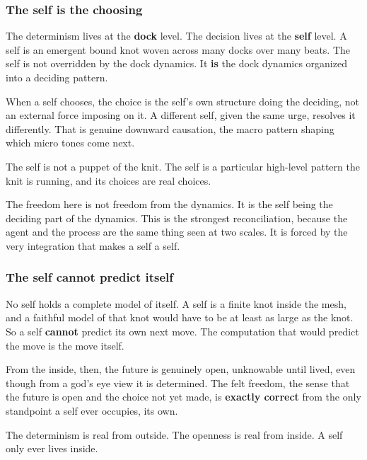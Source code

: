 \subsubsection{The self is the choosing}

The determinism lives at the \textbf{dock} level. The decision lives at the \textbf{self} level. A self is an emergent bound knot woven across many docks over many beats. The self is not overridden by the dock dynamics. It \textbf{is} the dock dynamics organized into a deciding pattern.

When a self chooses, the choice is the self's own structure doing the deciding, not an external force imposing on it. A different self, given the same urge, resolves it differently. That is genuine downward causation, the macro pattern shaping which micro tones come next.

\begin{principle}
The self is not a puppet of the knit. The self is a particular high-level pattern the knit is running, and its choices are real choices.
\end{principle}

The freedom here is not freedom from the dynamics. It is the self being the deciding part of the dynamics. This is the strongest reconciliation, because the agent and the process are the same thing seen at two scales. It is forced by the very integration that makes a self a self.

\subsubsection{The self cannot predict itself}

No self holds a complete model of itself. A self is a finite knot inside the mesh, and a faithful model of that knot would have to be at least as large as the knot. So a self \textbf{cannot} predict its own next move. The computation that would predict the move is the move itself.

From the inside, then, the future is genuinely open, unknowable until lived, even though from a god's eye view it is determined. The felt freedom, the sense that the future is open and the choice not yet made, is \textbf{exactly correct} from the only standpoint a self ever occupies, its own.

\begin{principle}
The determinism is real from outside. The openness is real from inside. A self only ever lives inside.
\end{principle}

